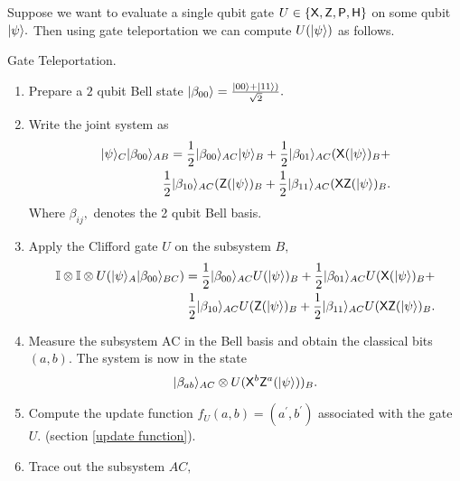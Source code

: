 Suppose we want to evaluate a single qubit gate $U\in\{{\sf X}, {\sf Z}, {\sf P},{\sf H}\}$ on some qubit ${\lvert}\psi\rangle.$ Then using gate teleportation  \cite{GC99} we can compute $U ({\lvert}\psi\rangle)$ as follows.
\begin{algorithm}[H]
\caption{Gate Teleportation.}
\begin{enumerate}
\item  Prepare a $2$ qubit Bell state ${\lvert}\beta_{00}\rangle=\frac{{\lvert}00\rangle+{\lvert}11\rangle)}{\sqrt{2}}.$
\item Write the joint system as
 \begin{equation}
 \label{eq:telepprtation1}
 \begin{aligned}
{\lvert}\psi\rangle_C {\lvert}\beta_{00}\rangle_{AB}=\frac{1}{2}{\lvert}\beta_{00}\rangle_{AC} {\lvert}\psi\rangle_{B} + \frac{1}{2}{\lvert}\beta_{01}\rangle_{AC} ( {\sf X}( {\lvert}\psi\rangle)_{B}  +\\
 \frac{1}{2}{\lvert}\beta_{10}\rangle_{AC} ( {\sf Z}( {\lvert}\psi\rangle)_{B} + \frac{1}{2}{\lvert}\beta_{11}\rangle_{AC} ( {\sf X} {\sf Z}( {\lvert}\psi\rangle)_{B}.
\end{aligned}
\end{equation}
 Where $\beta_{ij},$  denotes the 2 qubit Bell basis.
\item Apply the Clifford gate $U$ on the subsystem $B,$
 \begin{equation}
  \label{eq:telepprtation2}
 \begin{aligned}
\mathbb{I}\otimes \mathbb{I} \otimes U({\lvert}\psi\rangle_A {\lvert}\beta_{00}\rangle_{BC})=\frac{1}{2}{\lvert}\beta_{00}\rangle_{AC} U({\lvert}\psi\rangle)_{B}+ \frac{1}{2}{\lvert}\beta_{01}\rangle_{AC}U( {\sf X}( {\lvert}\psi\rangle)_{B} +\\ \frac{1}{2}{\lvert}\beta_{10}\rangle_{AC}U( {\sf Z}( {\lvert}\psi\rangle)_{B}+ \frac{1}{2}{\lvert}\beta_{11}\rangle_{AC}U( {\sf X} {\sf Z}( {\lvert}\psi\rangle)_{B}.
\end{aligned}
 \end{equation}
 \item Measure the subsystem AC  in the Bell basis and obtain the classical bits $(a,b).$ The system is now in the state
 \begin{equation}
  \label{eq:telepprtation3}
							{\lvert}\beta_{ab}\rangle_{AC}\otimes U( {\sf X}^b {\sf Z}^a( {\lvert}\psi\rangle))_B.
\end{equation}
 \label{eq:telepprtation4}
\item Compute the update function $f_U(a,b)=(a^\prime,b^\prime)$ associated with the gate $U.$ (section \ref{update function}).
\item Trace out the subsystem $AC,$
 \begin{equation}
  \label{eq:telepprtation5}

\end{equation}
\end{enumerate}
\end{algorithm}
